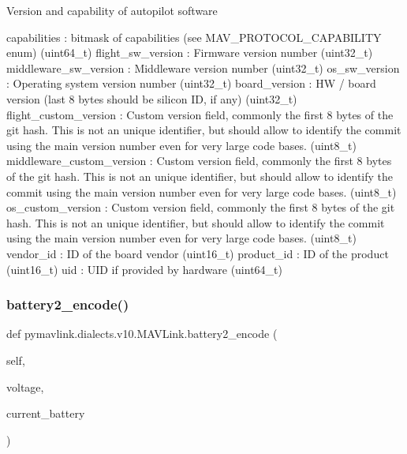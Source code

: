 \begin{DoxyVerb}Version and capability of autopilot software

capabilities              : bitmask of capabilities (see MAV_PROTOCOL_CAPABILITY enum) (uint64_t)
flight_sw_version         : Firmware version number (uint32_t)
middleware_sw_version        : Middleware version number (uint32_t)
os_sw_version             : Operating system version number (uint32_t)
board_version             : HW / board version (last 8 bytes should be silicon ID, if any) (uint32_t)
flight_custom_version        : Custom version field, commonly the first 8 bytes of the git hash. This is not an unique identifier, but should allow to identify the commit using the main version number even for very large code bases. (uint8_t)
middleware_custom_version        : Custom version field, commonly the first 8 bytes of the git hash. This is not an unique identifier, but should allow to identify the commit using the main version number even for very large code bases. (uint8_t)
os_custom_version         : Custom version field, commonly the first 8 bytes of the git hash. This is not an unique identifier, but should allow to identify the commit using the main version number even for very large code bases. (uint8_t)
vendor_id                 : ID of the board vendor (uint16_t)
product_id                : ID of the product (uint16_t)
uid                       : UID if provided by hardware (uint64_t)\end{DoxyVerb}
 \mbox{\label{classpymavlink_1_1dialects_1_1v10_1_1MAVLink_a924c3eb02cb9f1fd84c5ac841951f6e0}} 
\subsubsection{\texorpdfstring{battery2\+\_\+encode()}{battery2\_encode()}}
{\footnotesize\ttfamily def pymavlink.\+dialects.\+v10.\+M\+A\+V\+Link.\+battery2\+\_\+encode (\begin{DoxyParamCaption}\item[{}]{self,  }\item[{}]{voltage,  }\item[{}]{current\+\_\+battery }\end{DoxyParamCaption})}

